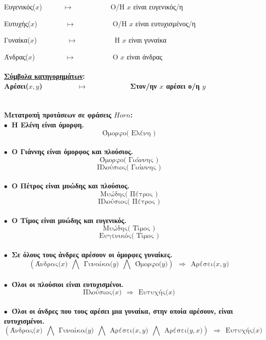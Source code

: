 \documentclass[10pt]{article}
\begin{document}
\hspace{5mm}Ευγενικός($x$)\ \ \ \ \ \ $\mapsto$   \ \ \ \ \ \ \ \ \ \
Ο/Η $x$ είναι ευγενικός/η

\hspace{5mm}Ευτυχής($x$)\ \ \ \ \ \ \ \ $\mapsto$   \ \ \ \ \ \ \ \ \ \ Ο/Η $x$ είναι ευτυχισμένος/η

\hspace{5mm}Γυναίκα($x$) \ \ \ \ \ \ 
 \ \ $\mapsto$   \ \ \ \ \ \ \ \ \ \ Η $x$ είναι γυναίκα
 
\hspace{5mm}Άνδρας($x$) \ \ \ \ \ \ \ \ $\mapsto$   \ \ \ \ \ \ \ \ \ \ Ο $x$ είναι άνδρας \\ \\

\bf \underline{Σύμβολα κατηγορημάτων}:
\normalfont \\

\hspace{5mm}Αρέσει($x,y$) \ \ \ \ \ \ \ \ $\mapsto$   \ \ \ \ \ \ \ \ \ \ Στον/ην $x$ αρέσει ο/η $y$\\ \\ \\
Μετατροπή προτάσεων σε φράσεις $Horn$: \\

$\bullet \ $ Η Ελένη είναι όμορφη. 
\[
\text{Όμορφο( \ Ελένη \ )}
\]
\\

$\bullet \ $ Ο Γιάννης είναι όμορφος και πλούσιος.
\[
\text{Όμορφο( \ Γιάννης \ )} \]
\[
\text{Πλούσιος( \ Γιάννης \ )}
\] \\

$\bullet \ $ Ο Πέτρος είναι μυώδης και πλούσιος.
\[
\text{Μυώδης( \ Πέτρος \ )} \]
\[
\text{Πλούσιος( \ Πέτρος \ )}
\] \\

$\bullet \ $ Ο Τίμος είναι μυώδης και ευγενικός.
\[
\text{Μυώδης( \ Τίμος\ )} \]
\[
\text{Ευγενικός( \ Τίμος \ )}
\] \\

$\bullet \ $ Σε όλους τους άνδρες αρέσουν οι όμορφες γυναίκες. 
\[
\left( \text{Άνδρας($x$)} \ \ \bigwedge \ \ \text{Γυναίκα($y$)} \ \ \bigwedge \ \ \text{Όμορφο($y$)} \right) \ \ \Rightarrow \ \ \text{Αρέσει($x,y$)}
\]\\

$\bullet \ $ Όλοι οι πλούσιοι είναι ευτυχισμένοι. 
\[
\text{Πλούσιος($x$)} \ \ \Rightarrow \ \ \text{Ευτυχής($x$)}
\]\\

$\bullet \ $ Όλοι οι άνδρες που τους αρέσει μια γυναίκα, στην οποία αρέσουν, είναι ευτυχισμένοι.
\[
\left( \text{Άνδρας($x$)} \ \ \bigwedge \ \ \text{Γυναίκα($y$)} \ \ \bigwedge \ \  \text{Αρέσει($x,y$)} \ \ \bigwedge \ \  \text{Αρέσει($y,x$)} \right) \ \ \Rightarrow \ \ \text{Ευτυχής($x$)}
\]\\
\end{document}
